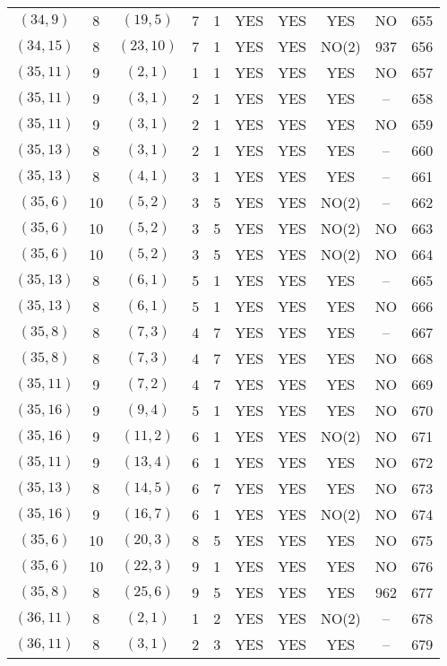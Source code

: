 \begin{longtable}{|c|c|c|c|c|c|c|c|c|c|}
$(34, 9)$ & 8 & $(19, 5)$ & 7 & 1 & YES & YES & YES & NO & 655\\
$(34, 15)$ & 8 & $(23, 10)$ & 7 & 1 & YES & YES & NO(2) & 937 & 656\\
$(35, 11)$ & 9 & $(2, 1)$ & 1 & 1 & YES & YES & YES & NO & 657\\
$(35, 11)$ & 9 & $(3, 1)$ & 2 & 1 & YES & YES & YES & -- & 658\\
$(35, 11)$ & 9 & $(3, 1)$ & 2 & 1 & YES & YES & YES & NO & 659\\
$(35, 13)$ & 8 & $(3, 1)$ & 2 & 1 & YES & YES & YES & -- & 660\\
$(35, 13)$ & 8 & $(4, 1)$ & 3 & 1 & YES & YES & YES & -- & 661\\
$(35, 6)$ & 10 & $(5, 2)$ & 3 & 5 & YES & YES & NO(2) & -- & 662\\
$(35, 6)$ & 10 & $(5, 2)$ & 3 & 5 & YES & YES & NO(2) & NO & 663\\
$(35, 6)$ & 10 & $(5, 2)$ & 3 & 5 & YES & YES & NO(2) & NO & 664\\
$(35, 13)$ & 8 & $(6, 1)$ & 5 & 1 & YES & YES & YES & -- & 665\\
$(35, 13)$ & 8 & $(6, 1)$ & 5 & 1 & YES & YES & YES & NO & 666\\
$(35, 8)$ & 8 & $(7, 3)$ & 4 & 7 & YES & YES & YES & -- & 667\\
$(35, 8)$ & 8 & $(7, 3)$ & 4 & 7 & YES & YES & YES & NO & 668\\
$(35, 11)$ & 9 & $(7, 2)$ & 4 & 7 & YES & YES & YES & NO & 669\\
$(35, 16)$ & 9 & $(9, 4)$ & 5 & 1 & YES & YES & YES & NO & 670\\
$(35, 16)$ & 9 & $(11, 2)$ & 6 & 1 & YES & YES & NO(2) & NO & 671\\
$(35, 11)$ & 9 & $(13, 4)$ & 6 & 1 & YES & YES & YES & NO & 672\\
$(35, 13)$ & 8 & $(14, 5)$ & 6 & 7 & YES & YES & YES & NO & 673\\
$(35, 16)$ & 9 & $(16, 7)$ & 6 & 1 & YES & YES & NO(2) & NO & 674\\
$(35, 6)$ & 10 & $(20, 3)$ & 8 & 5 & YES & YES & YES & NO & 675\\
$(35, 6)$ & 10 & $(22, 3)$ & 9 & 1 & YES & YES & YES & NO & 676\\
$(35, 8)$ & 8 & $(25, 6)$ & 9 & 5 & YES & YES & YES & 962 & 677\\
$(36, 11)$ & 8 & $(2, 1)$ & 1 & 2 & YES & YES & NO(2) & -- & 678\\
$(36, 11)$ & 8 & $(3, 1)$ & 2 & 3 & YES & YES & YES & -- & 679\\

\end{longtable}
